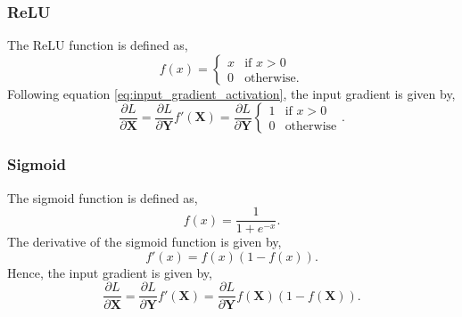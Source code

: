 \documentclass[twocolumn,pra,floatfix]{revtex4-2}
\begin{document}
            \subsubsection{ReLU}\label{relu}
            
                The ReLU function is defined as,
                \begin{equation}
                    f(x) = 
                    \begin{cases}
                        x & \text{if } x > 0 \\
                        0 & \text{otherwise}.
                    \end{cases}
                \end{equation}
                Following equation \ref{eq:input_gradient_activation}, the input gradient is given by,
                \begin{equation}
                    \frac{\partial L}{\partial \mathbf{X}} = 
                    \frac{\partial L}{\partial \mathbf{Y}} f'(\mathbf{X}) = 
                    \frac{\partial L}{\partial \mathbf{Y}}
                    \begin{cases}
                        1 & \text{if } x > 0 \\
                        0 & \text{otherwise}
                    \end{cases}.
                \end{equation}
                
            \subsubsection{Sigmoid}\label{sigmoid}
            
                The sigmoid function is defined as,
                \begin{equation}
                    f(x) = \frac{1}{1 + e^{-x}}\label{eq:sig}.
                \end{equation}
                The derivative of the sigmoid function is given by,
                \begin{equation}
                    f'(x) = f(x)(1 - f(x)).
                \end{equation}
                Hence, the input gradient is given by,
                \begin{equation}
                    \frac{\partial L}{\partial \mathbf{X}} = 
                    \frac{\partial L}{\partial \mathbf{Y}} f'(\mathbf{X}) = 
                    \frac{\partial L}{\partial \mathbf{Y}} f(\mathbf{X})(1 - f(\mathbf{X})).
                \end{equation}
                
\end{document}
